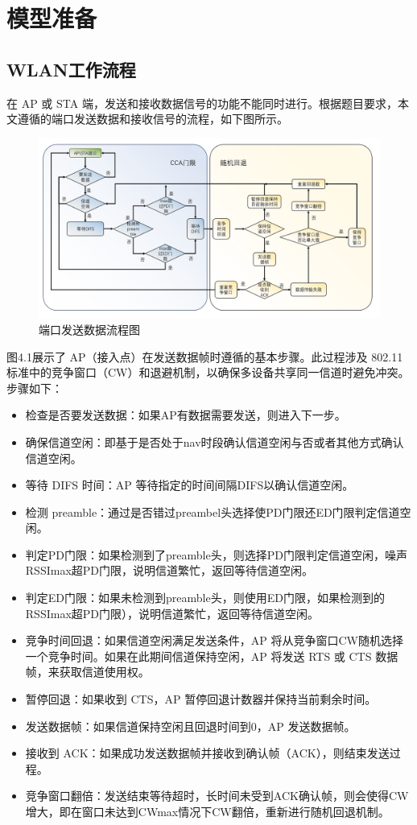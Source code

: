 \section{模型准备}
\subsection{WLAN工作流程}

在 AP 或 STA 端，发送和接收数据信号的功能不能同时进行。根据题目要求，本文遵循的端口发送数据和接收信号的流程，如下图所示。

\begin{figure}[H]
	\centering
	\includegraphics[width=0.9\linewidth]{figures/4.1}
	\caption{端口发送数据流程图}
	\label{fig:端口发送数据流程图}
\end{figure}

图4.1展示了 AP（接入点）在发送数据帧时遵循的基本步骤。此过程涉及 802.11 标准中的竞争窗口（CW）和退避机制，以确保多设备共享同一信道时避免冲突。步骤如下：

\begin{itemize}
	\item 检查是否要发送数据：如果AP有数据需要发送，则进入下一步。
	\item 确保信道空闲：即基于是否处于nav时段确认信道空闲与否或者其他方式确认信道空闲。
	\item 等待 DIFS 时间：AP 等待指定的时间间隔DIFS以确认信道空闲。
	\item 检测 preamble：通过是否错过preambel头选择使PD门限还ED门限判定信道空闲。
	\item 判定PD门限：如果检测到了preamble头，则选择PD门限判定信道空闲，噪声RSSImax超PD门限，说明信道繁忙，返回等待信道空闲。
	\item 判定ED门限：如果未检测到preamble头，则使用ED门限，如果检测到的RSSImax超PD门限），说明信道繁忙，返回等待信道空闲。
	\item 竞争时间回退：如果信道空闲满足发送条件，AP 将从竞争窗口CW随机选择一个竞争时间。如果在此期间信道保持空闲，AP 将发送 RTS 或 CTS 数据帧，来获取信道使用权。
	\item 暂停回退：如果收到 CTS，AP 暂停回退计数器并保持当前剩余时间。
	\item 发送数据帧：如果信道保持空闲且回退时间到0，AP 发送数据帧。
	\item 接收到 ACK：如果成功发送数据帧并接收到确认帧（ACK），则结束发送过程。
	\item 竞争窗口翻倍：发送结束等待超时，长时间未受到ACK确认帧，则会使得CW增大，即在窗口未达到CWmax情况下CW翻倍，重新进行随机回退机制。
\end{itemize}

